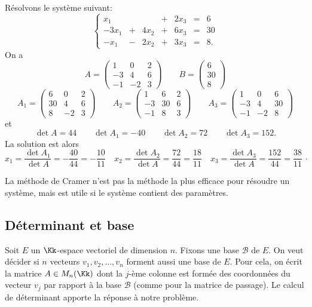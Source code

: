 \documentclass[class=report,crop=false]{standalone}
\begin{document}
\begin{exemple} Résolvons le système suivant:
\[\left\{
\begin{array}{ccccccc}
x_1 & && + &2x_3 & = &6\\
 -3x_1 &+ &4x_2 &+ &6x_3 & = & 30\\
 -x_1 &- &2x_2 &+ &3 x_3 & = & 8. \end{array}
\right. \]
On a
\[
A = \left(
\begin{array}{rrc}
1 & 0 & 2\\
-3 & 4 & 6\\
-1 & -2 & 3
\end{array}\right)
\qquad
B = \left(
\begin{array}{c} 6 \\ 30 \\ 8 \end{array}\right)
\]\[
A_1 = \left(
\begin{array}{crc}
6 & 0 & 2\\
30 & 4 & 6\\
8 & -2 & 3
\end{array}\right)
\qquad  A_2 = \left(
\begin{array}{rcc}
1 & 6 & 2\\
-3 & 30 & 6\\
-1 & 8 & 3
\end{array}\right)
\qquad  A_3 = \left(
\begin{array}{rrc}
1 & 0 & 6\\
-3 & 4 & 30\\
-1 & -2 & 8
\end{array}\right)
\]
et
$$\det A  =  44 \qquad \det A_1  =  -40 \qquad
\det A_2  =  72 \qquad \det A_3  =  152.$$
La solution est alors
\[
x_1 = \frac{\det A_1}{\det A} = -\frac{40}{44} = -\frac{10}{11}\quad
x_2 = \frac{\det A_2}{\det A} = \frac{72}{44}  = \frac{18}{11}\quad
x_3 = \frac{\det A_3}{\det A} = \frac{152}{44} = \frac{38}{11} \, \cdotp
\]
\end{exemple}

La méthode de Cramer n'est pas la méthode la plus efficace pour résoudre un système,
mais est utile si le système contient des paramètres.


\subsection{Déterminant et base}

Soit $E$ un $\Kk$-espace vectoriel de dimension $n$.
Fixons une base $\mathcal{B}$ de $E$.
On veut décider si $n$ vecteurs $v_1,v_2,\ldots,v_n$ forment aussi une base de $E$.
Pour cela, on écrit la matrice $A \in M_n(\Kk)$ dont la $j$-ème colonne est formée
des coordonnées du vecteur $v_j$ par rapport à la base $\mathcal{B}$
(comme pour la matrice de passage).
Le calcul de déterminant apporte la réponse à notre problème.
\end{document}
